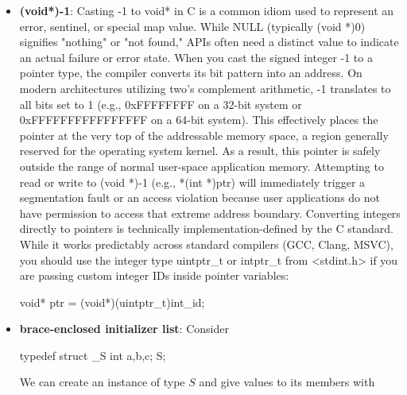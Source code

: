 \documentclass{report}
\begin{document}
        \pagebreak 
        \begin{itemize}
            \item \textbf{(void*)-1}: Casting -1 to void* in C is a common idiom used to represent an error, sentinel, or special map value.
                \bigbreak \noindent 
                While NULL (typically (void *)0) signifies "nothing" or "not found," APIs often need a distinct value to indicate an actual failure or error state.
                \bigbreak \noindent 
                When you cast the signed integer -1 to a pointer type, the compiler converts its bit pattern into an address.
                \bigbreak \noindent 
                On modern architectures utilizing two's complement arithmetic, -1 translates to all bits set to 1 (e.g., 0xFFFFFFFF on a 32-bit system or 0xFFFFFFFFFFFFFFFF on a 64-bit system).
                \bigbreak \noindent 
                This effectively places the pointer at the very top of the addressable memory space, a region generally reserved for the operating system kernel. As a result, this pointer is safely outside the range of normal user-space application memory.
                \bigbreak \noindent 
                Attempting to read or write to (void *)-1 (e.g., *(int *)ptr) will immediately trigger a segmentation fault or an access violation because user applications do not have permission to access that extreme address boundary.
                \bigbreak \noindent 
                Converting integers directly to pointers is technically implementation-defined by the C standard. While it works predictably across standard compilers (GCC, Clang, MSVC), you should use the integer type uintptr\_t or intptr\_t from <stdint.h> if you are passing custom integer IDs inside pointer variables:
                \bigbreak \noindent 
                \begin{cppcode}
                    void* ptr = (void*)(uintptr_t)int_id;
                \end{cppcode}
            \item \textbf{brace-enclosed initializer list}: Consider
                \bigbreak \noindent 
                \begin{cppcode}
                    typedef struct _S {
                        int a,b,c;
                    } S;
                \end{cppcode}
                \bigbreak \noindent 
                We can create an instance of type $S$ and give values to its members with
                \bigbreak \noindent 

\end{itemize}
\end{document}
